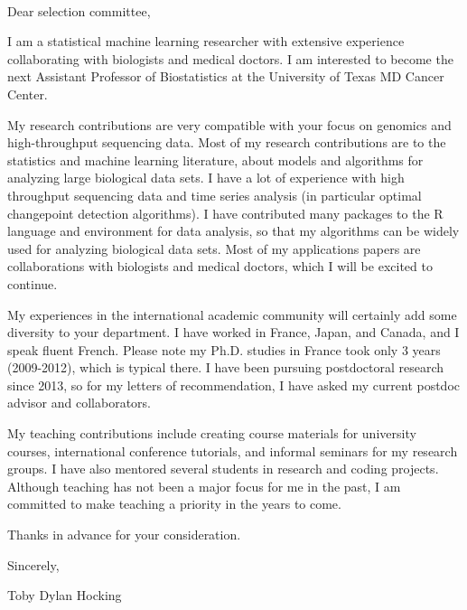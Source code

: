 \documentclass{article}
\begin{document}
\mbox{ }

Dear selection committee,

I am a 
statistical machine learning researcher with extensive experience
collaborating with biologists and medical doctors. I am interested to
become the next Assistant Professor of Biostatistics 
at the University of Texas MD Cancer Center.

My research contributions are very compatible with your focus on
genomics and high-throughput sequencing data. Most of my research
contributions are to the statistics and machine learning literature,
about models and algorithms for analyzing large biological data sets.
I have a lot of experience with high throughput sequencing data and
time series analysis (in particular optimal changepoint detection
algorithms).  I have contributed many packages to the R language and
environment for data analysis, so that my algorithms can be widely
used for analyzing biological data sets.
Most of my applications papers are collaborations with biologists and
medical doctors, which I will be excited to continue. 

My experiences in the international academic community will certainly
add some diversity to your department. I have worked in France, Japan,
and Canada, and I speak fluent French. Please note my Ph.D. studies in
France took only 3 years (2009-2012), which is typical there.
I have been
pursuing postdoctoral research since 2013, so for my letters of
recommendation, I have asked my current postdoc advisor and
collaborators.

My teaching contributions include creating course materials for
university courses, international conference tutorials, and informal
seminars for my research groups. I have also mentored several students
in research and coding projects. Although teaching has not been a
major focus for me in the past, I am committed to make teaching a
priority in the years to come.



Thanks in advance for your consideration.

Sincerely,


Toby Dylan Hocking
\end{document}
